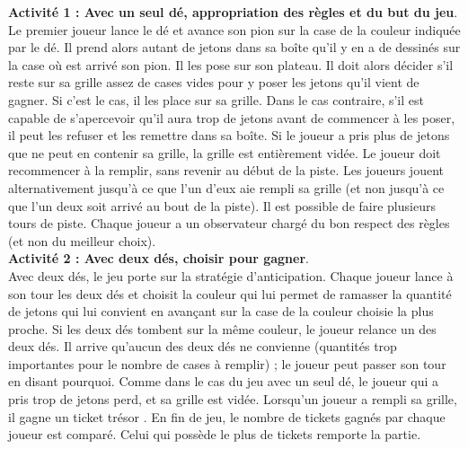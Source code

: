\begin{exercice*}
\begin{center}
   \end{center}
   {\bf Activité 1 : Avec un seul dé, appropriation des règles et du but du jeu}. \\
    Le premier joueur lance le dé et avance son pion sur la case de la couleur indiquée par le dé. Il prend alors autant de jetons dans sa boîte qu’il y en a de dessinés sur la case où est arrivé son pion. Il les pose sur son plateau. Il doit alors décider s’il reste sur sa grille assez de cases vides pour y poser les jetons qu’il vient de gagner. Si c’est le cas, il les place sur sa grille. Dans le cas contraire, s’il est capable de s’apercevoir qu’il aura trop de jetons avant de commencer à les poser, il peut les refuser et les remettre dans sa boîte. Si le joueur a pris plus de jetons que ne peut en contenir sa grille, la grille est entièrement vidée. Le joueur doit recommencer à la remplir, sans revenir au début de la piste. Les joueurs jouent alternativement jusqu’à ce que l’un d’eux aie rempli sa grille (et non jusqu’à ce que l’un deux soit arrivé au bout de la piste). Il est possible de faire plusieurs tours de piste. Chaque joueur a un observateur chargé du bon respect des règles (et non du meilleur choix). \\
   {\bf Activité 2 : Avec deux dés, choisir pour gagner}. \\
   Avec deux dés, le jeu porte sur la stratégie d’anticipation. Chaque joueur lance à son tour les deux dés et choisit la couleur qui lui permet de ramasser la quantité de jetons qui lui convient en avançant sur la case de la couleur choisie la plus proche. Si les deux dés tombent sur la même couleur, le joueur relance un des deux dés. Il arrive qu’aucun des deux dés ne convienne (quantités trop importantes pour le nombre de cases à remplir) ; le joueur peut passer son tour en disant pourquoi. Comme dans le cas du jeu avec un seul dé, le joueur qui a pris trop de jetons perd, et sa grille est vidée. Lorsqu’un joueur a rempli sa grille, il gagne un ticket \og trésor \fg. En fin de jeu, le nombre de tickets gagnés par chaque joueur est comparé. Celui qui possède le plus de tickets remporte la partie.
\end{exercice*}

\bigskip



